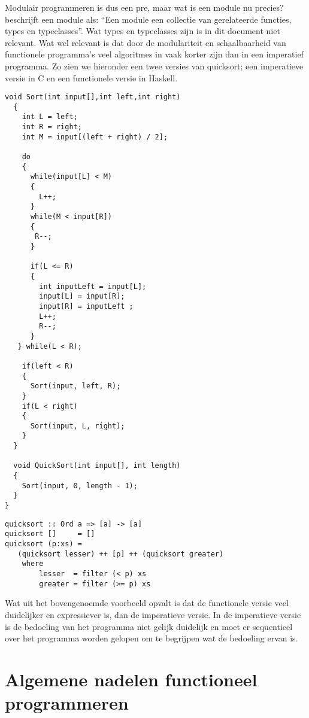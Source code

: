 \documentclass[twoside,twocolumn]{article}
\begin{document}
Modulair programmeren is dus een pre, maar wat is een module nu precies?
\textcite[hdfst.~6]{src16} beschrijft een module als: \enquote{Een module een
collectie van gerelateerde functies, types en typeclasses}. Wat types en
typeclasses zijn is in dit document niet relevant. Wat wel relevant is dat door
de modulariteit en schaalbaarheid van functionele programma's veel algoritmes
in vaak korter zijn dan in een imperatief programma. Zo zien we hieronder een
twee versies van quicksort; een imperatieve versie in C en een functionele
versie in Haskell.

\begin{lstlisting}[style=CStyle]
  void Sort(int input[],int left,int right)
  {
    int L = left;
    int R = right;
    int M = input[(left + right) / 2];

    do
    {
      while(input[L] < M)
      {
        L++;
      }
      while(M < input[R])
      {
       R--;
      }

      if(L <= R)
      {
        int inputLeft = input[L];
        input[L] = input[R];
        input[R] = inputLeft ;
        L++;
        R--;
      }
   } while(L < R);

    if(left < R)
    {
      Sort(input, left, R);
    }
    if(L < right)
    {
      Sort(input, L, right);
    }
  }

  void QuickSort(int input[], int length)
  {
    Sort(input, 0, length - 1);
  }
}
\end{lstlisting}

\begin{lstlisting}[style=HsStyle]
quicksort :: Ord a => [a] -> [a]
quicksort []     = []
quicksort (p:xs) =
   (quicksort lesser) ++ [p] ++ (quicksort greater)
    where
        lesser  = filter (< p) xs
        greater = filter (>= p) xs
\end{lstlisting}

Wat uit het bovengenoemde voorbeeld opvalt is dat de functionele versie veel
duidelijker en expressiever is, dan de imperatieve versie. In de imperatieve
versie is de bedoeling van het programma niet gelijk duidelijk en moet er
sequentieel over het programma worden gelopen om te begrijpen wat de bedoeling
ervan is.


\section{Algemene nadelen functioneel programmeren}
\label{sec:4}
\end{document}
